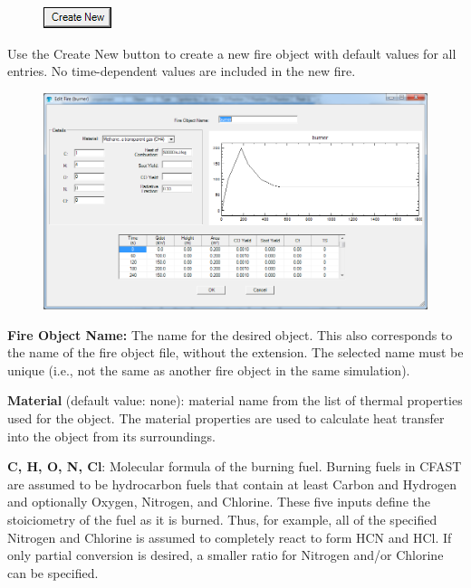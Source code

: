 \begin{figure}
  \includegraphics[width=0.781in]{FIGURES/Input_File/Create_New_Button}
\end{figure}

Use the Create New button to create a new fire object with default values for all entries.  No time-dependent values are included in the new fire.

\begin{figure}[h!]
\begin{center}
\includegraphics[width=6.5in]{FIGURES/Input_File/Fire_Object_Edit}
\end{center}
\end{figure}

\textbf{Fire Object Name:} The name for the desired object.  This also corresponds to the name of the fire object file, without the extension. The selected name must be unique (i.e., not the same as another fire object in the same simulation).

\textbf{Material} (default value: none): material name from the list of thermal properties used for the object. The material properties are used to calculate heat transfer into the object from its surroundings.

\textbf{C, H, O, N, Cl}: Molecular formula of the burning fuel. Burning fuels in CFAST are assumed to be hydrocarbon fuels that contain at least Carbon and Hydrogen and optionally Oxygen, Nitrogen, and Chlorine. These five inputs define the stoiciometry of the fuel as it is burned.  Thus, for example, all of the specified Nitrogen and Chlorine is assumed to completely react to form HCN and HCl.  If only partial conversion is desired, a smaller ratio for Nitrogen and/or Chlorine can be specified.

